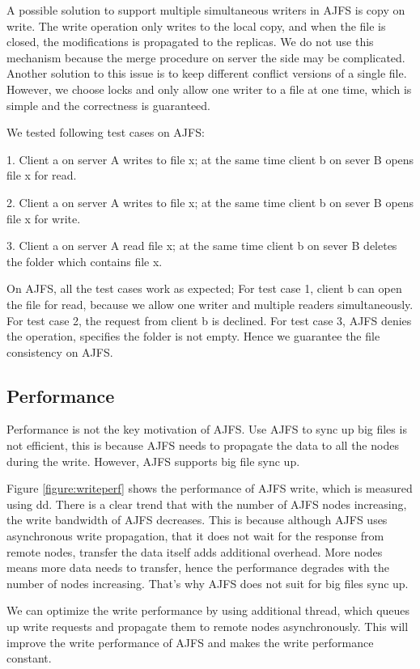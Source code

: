 A possible solution to support multiple simultaneous writers in AJFS is copy on write. The write operation only writes to the local copy, and when the file is closed, the modifications is propagated to the replicas. We do not use this mechanism because the merge procedure on server the side may be complicated. Another solution to this issue is to keep different conflict versions of a single file. 
However, we choose locks and only allow one writer to a file at one time, which is simple and the correctness is guaranteed.

We tested following test cases on AJFS:

1. Client a on server A writes to file x; at the same time client b on sever B opens file x for read.

2. Client a on server A writes to file x; at the same time client b on sever B opens file x for write.

3. Client a on server A read file x; at the same time client b on sever B deletes the folder which contains file x.

On AJFS, all the test cases work as expected; For test case 1, client b can open the file for read, because we allow one writer and multiple readers simultaneously. For test case 2, the request from client b is declined. For test case 3, AJFS denies the operation, specifies the folder is not empty. Hence we guarantee the file consistency on AJFS.

\subsection{Performance}

Performance is not the key motivation of AJFS. Use AJFS to sync up big files is not efficient, this is because AJFS needs to propagate the data to all the nodes during the write.
However, AJFS supports big file sync up.

Figure \ref{figure:writeperf} shows the performance of AJFS write, which is measured using dd.
There is a clear trend that with the number of AJFS nodes increasing,
the write bandwidth of AJFS decreases. This is because although AJFS uses asynchronous write propagation, that it does not wait for the response from remote nodes,
transfer the data itself adds additional overhead. 
More nodes means more data needs to transfer, hence the performance degrades with the number of nodes increasing.
That's why AJFS does not suit for big files sync up.

We can optimize the write performance by using additional thread, which queues up write requests and propagate them to remote nodes asynchronously.
This will improve the write performance of AJFS and makes the write performance constant.

